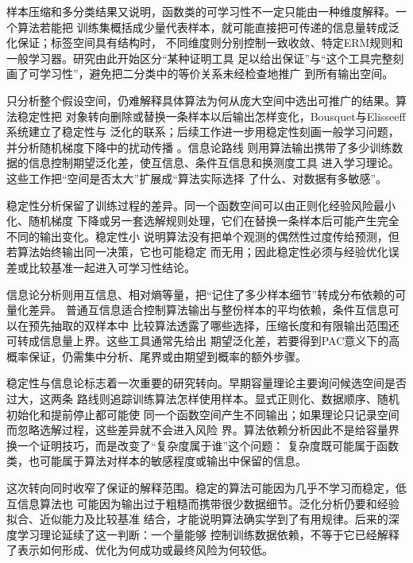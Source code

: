 样本压缩和多分类结果又说明，函数类的可学习性不一定只能由一种维度解释。一个算法若能把
训练集概括成少量代表样本，就可能直接把可传递的信息量转成泛化保证；标签空间具有结构时，
不同维度则分别控制一致收敛、特定ERM规则和一般学习器。研究由此开始区分“某种证明工具
足以给出保证”与“这个工具完整刻画了可学习性”，避免把二分类中的等价关系未经检查地推广
到所有输出空间。

只分析整个假设空间，仍难解释具体算法为何从庞大空间中选出可推广的结果。算法稳定性把
对象转向删除或替换一条样本以后输出怎样变化，Bousquet与Elisseeff系统建立了稳定性与
泛化的联系；后续工作进一步用稳定性刻画一般学习问题，并分析随机梯度下降中的扰动传播
。信息论路线
则用算法输出携带了多少训练数据的信息控制期望泛化差，使互信息、条件互信息和换测度工具
进入学习理论。这些工作把“空间是否太大”扩展成“算法实际选择
了什么、对数据有多敏感”。

稳定性分析保留了训练过程的差异。同一个函数空间可以由正则化经验风险最小化、随机梯度
下降或另一套选解规则处理，它们在替换一条样本后可能产生完全不同的输出变化。稳定性小
说明算法没有把单个观测的偶然性过度传给预测，但若算法始终输出同一决策，它也可能稳定
而无用；因此稳定性必须与经验优化误差或比较基准一起进入可学习性结论。

信息论分析则用互信息、相对熵等量，把“记住了多少样本细节”转成分布依赖的可量化差异。
普通互信息适合控制算法输出与整份样本的平均依赖，条件互信息可以在预先抽取的双样本中
比较算法透露了哪些选择，压缩长度和有限输出范围还可转成信息量上界。这些工具通常先给出
期望泛化差，若要得到PAC意义下的高概率保证，仍需集中分析、尾界或由期望到概率的额外步骤。

稳定性与信息论标志着一次重要的研究转向。早期容量理论主要询问候选空间是否过大，这两条
路线则追踪训练算法怎样使用样本。显式正则化、数据顺序、随机初始化和提前停止都可能使
同一个函数空间产生不同输出；如果理论只记录空间而忽略选解过程，这些差异就不会进入风险
界。算法依赖分析因此不是给容量界换一个证明技巧，而是改变了“复杂度属于谁”这个问题：
复杂度既可能属于函数类，也可能属于算法对样本的敏感程度或输出中保留的信息。

这次转向同时收窄了保证的解释范围。稳定的算法可能因为几乎不学习而稳定，低互信息算法也
可能因为输出过于粗糙而携带很少数据细节。泛化分析仍要和经验拟合、近似能力及比较基准
结合，才能说明算法确实学到了有用规律。后来的深度学习理论延续了这一判断：一个量能够
控制训练数据依赖，不等于它已经解释了表示如何形成、优化为何成功或最终风险为何较低。

